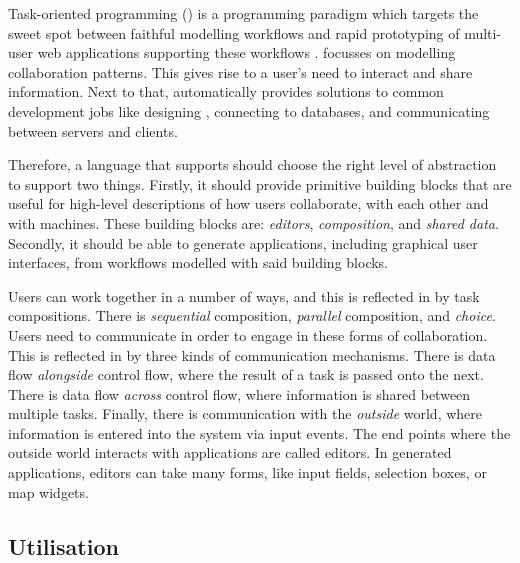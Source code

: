 Task-oriented programming (\TOP) is a programming paradigm which targets the sweet spot between faithful modelling workflows
and rapid prototyping of multi-user web applications supporting these workflows \cite{conf/ppdp/PlasmeijerLMAK12}.
\TOP focusses on modelling collaboration patterns.
This gives rise to a user's need to interact and share information.
Next to that, \TOP automatically provides solutions to common development jobs like designing , connecting to databases, and communicating between servers and clients.

Therefore,
a language that supports \TOP should choose the right level of abstraction to support two things.
Firstly, it should provide primitive building blocks that are useful for high-level descriptions of how users collaborate,
with each other and with machines.
These building blocks are: \emph{editors}, \emph{composition}, and \emph{shared data}.
Secondly, it should be able to generate applications, including graphical user interfaces, from workflows modelled with said building blocks.

Users can work together in a number of ways, and this is reflected in \TOP by task compositions.
There is \emph{sequential} composition, \emph{parallel} composition, and \emph{choice}.
Users need to communicate in order to engage in these forms of collaboration.
This is reflected in \TOP by three kinds of communication mechanisms.
There is data flow \emph{alongside} control flow, where the result of a task is passed onto the next.
There is data flow \emph{across} control flow, where information is shared between multiple tasks.
Finally, there is communication with the \emph{outside} world, where information is entered into the system via input events.
The end points where the outside world interacts with \TOP applications are called editors.
In generated applications, editors can take many forms, like input fields, selection boxes, or map widgets.



\subsection{Utilisation}


